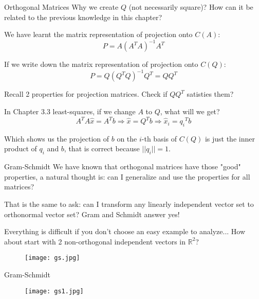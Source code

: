 \documentclass{beamer}
\begin{document}
\begin{frame}{Orthogonal Matrices}
Why we create $Q$ (not necessarily square)? How can it be related to the previous knowledge in this chapter?

\vspace{3pt}
We have learnt the matrix representation of projection onto $C(A)$:
\begin{equation*}
    P=A(A^TA)^{-1}A^T
\end{equation*}

If we write down the matrix representation of projection onto $C(Q)$:
\begin{equation*}
    P=Q(Q^TQ)^{-1}Q^T=QQ^T
\end{equation*}

\vspace{3pt}
Recall 2 properties for projection matrices. Check if $QQ^T$ satisties them?

\vspace{3pt}
In Chapter 3.3 least-squares, if we change $A$ to $Q$, what will we get?
\begin{equation*}
    A^TA\hat{x}=A^Tb\Rightarrow \hat{x}=Q^Tb\Rightarrow \hat{x}_i={q_i}^Tb
\end{equation*}

Which shows us the projection of $b$ on the $i$-th basis of $C(Q)$ is just the inner product of $q_i$ and $b$, that is correct because $||q_i||=1$.
\end{frame}

\begin{frame}{Gram-Schmidt}
We have known that orthogonal matrices have those "good" properties, a natural thought is: can I generalize and use the properties for all matrices?

\vspace{3pt}
That is the same to ask: can I transform any linearly independent vector set to orthonormal vector set? Gram and Schmidt answer yes!

\vspace{3pt}
Everything is difficult if you don't choose an easy example to analyze... How about start with 2 non-orthogonal independent vectors in $\mathbb{R}^2$?

\begin{figure}
    \centering
    \texttt{[image: gs.jpg]}
\end{figure}

\end{frame}

\begin{frame}{Gram-Schmidt}
\begin{figure}
    \centering
    \texttt{[image: gs1.jpg]}
\end{figure}
\end{frame}
\end{document}
